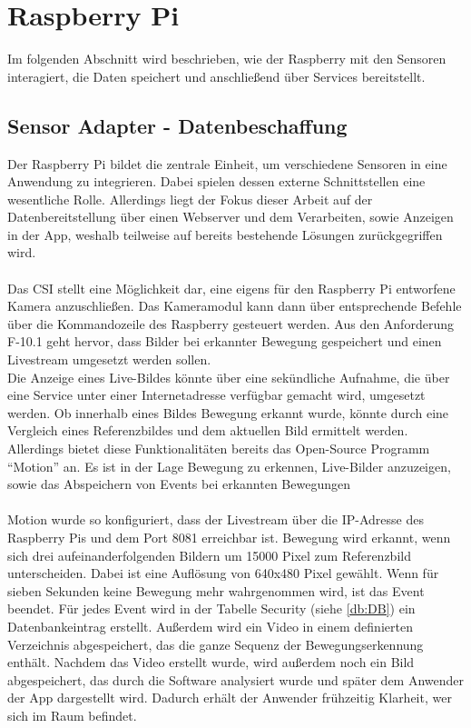 \section{Raspberry Pi} 
Im folgenden Abschnitt wird beschrieben, wie der Raspberry mit den Sensoren interagiert, die Daten speichert und anschließend über Services bereitstellt.

\subsection{Sensor Adapter - Datenbeschaffung}
Der Raspberry Pi bildet die zentrale Einheit, um verschiedene Sensoren in eine Anwendung zu integrieren. Dabei spielen dessen externe Schnittstellen eine wesentliche Rolle. Allerdings liegt der Fokus dieser Arbeit auf der Datenbereitstellung über einen Webserver und dem Verarbeiten, sowie Anzeigen in der App, weshalb teilweise auf bereits bestehende Lösungen zurückgegriffen wird.
\\\\Das \acf{CSI} stellt eine Möglichkeit dar, eine eigens für den Raspberry Pi entworfene Kamera anzuschließen. Das Kameramodul kann dann über entsprechende Befehle über die Kommandozeile des Raspberry gesteuert werden. Aus den Anforderung F-10.1 geht hervor, dass Bilder bei erkannter Bewegung gespeichert und einen Livestream umgesetzt werden sollen.\\Die Anzeige eines Live-Bildes könnte über eine sekündliche Aufnahme, die über eine Service unter einer Internetadresse verfügbar gemacht wird, umgesetzt werden. Ob innerhalb eines Bildes Bewegung erkannt wurde, könnte durch eine Vergleich eines Referenzbildes und dem aktuellen Bild ermittelt werden.\\Allerdings bietet diese Funktionalitäten bereits das Open-Source Programm \enquote{Motion} an. Es ist in der Lage Bewegung zu erkennen, Live-Bilder anzuzeigen, sowie das Abspeichern von Events bei erkannten Bewegungen\cite{motion:Motion}\\
\\Motion wurde so konfiguriert, dass der Livestream über die \ac{IP}-Adresse des Raspberry Pis und dem Port 8081 erreichbar ist. Bewegung wird erkannt, wenn sich drei aufeinanderfolgenden Bildern um 15000 Pixel zum Referenzbild unterscheiden. Dabei ist eine Auflösung von 640x480 Pixel gewählt. Wenn für sieben Sekunden keine Bewegung mehr wahrgenommen wird, ist das Event beendet. Für jedes Event wird in der Tabelle Security (siehe \autoref{db:DB}) ein Datenbankeintrag erstellt. Außerdem wird ein Video in einem definierten Verzeichnis abgespeichert, das die ganze Sequenz der Bewegungserkennung enthält. Nachdem das Video erstellt wurde, wird außerdem noch ein Bild abgespeichert, das durch die Software analysiert wurde und später dem Anwender der App dargestellt wird. Dadurch erhält der Anwender frühzeitig Klarheit, wer sich im Raum befindet.
